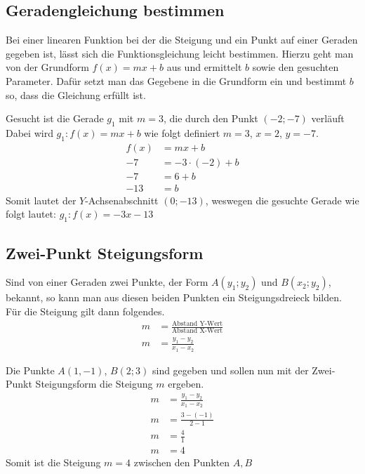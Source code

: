 \subsection{Geradengleichung bestimmen}\label{sec:Lineare Funktionen/Geradengleichung}
Bei einer linearen Funktion bei der die Steigung und ein Punkt auf einer Geraden gegeben ist, lässt sich die Funktionsgleichung leicht bestimmen. Hierzu geht man von der Grundform $f(x)=mx+b$ aus und ermittelt $b$ sowie den gesuchten Parameter. Dafür setzt man das Gegebene in die Grundform ein und bestimmt $b$ so, dass die Gleichung erfüllt ist.

\begin{beispiel}
Gesucht ist die Gerade $g_1$ mit $m=3$, die durch den Punkt $(-2;-7)$ verläuft
Dabei wird $g_1:f(x)=mx+b$ wie folgt definiert $m=3$, $x=2$, $y=-7$.
\begin{align*}
	f(x)&=mx+b\\
	-7&=-3\cdot (-2)+b\\
	-7&=6+b\\
	-13&=b
\end{align*}
Somit lautet der $Y$-Achsenabschnitt $(0;-13)$, weswegen die gesuchte Gerade wie folgt lautet: $g_1:f(x)=-3x-13$
\end{beispiel}
\subsection{Zwei-Punkt Steigungsform}\label{sec:Lineare Funktionen/Zwei-Punkt Steigungsform}
Sind von einer Geraden zwei Punkte, der Form $A(y_1;y_2)$ und $B(x_2;y_2)$, bekannt, so kann man aus diesen beiden Punkten ein Steigungsdreieck bilden. Für die Steigung gilt dann folgendes.
\begin{align*}
	m&=\frac{\text{Abstand Y-Wert}}{\text{Abstand X-Wert}}\\
	m&=\frac{y_1-y_2}{x_1-x_2}
\end{align*}

\begin{beispiel}
Die Punkte $A(1,-1)$, $B(2;3)$ sind gegeben und sollen nun mit der Zwei-Punkt Steigungsform die Steigung $m$ ergeben. 
	\begin{align*}
		m&=\frac{y_1-y_2}{x_1-x_2}\\
		m&=\frac{3-(-1)}{2-1}\\
		m&=\frac{4}{1}\\
		m&=4
	\end{align*}
	Somit ist die Steigung $m=4$ zwischen den Punkten $A,B$
\end{beispiel}

